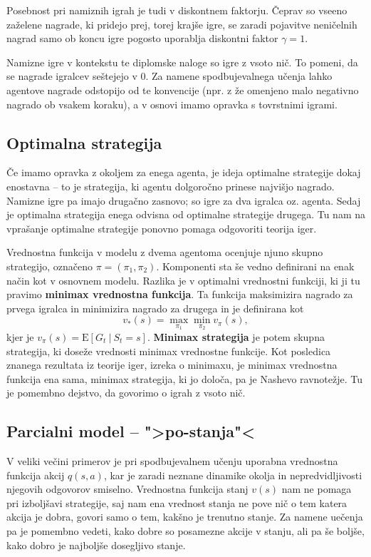\documentclass[12pt,a4paper]{amsart}
\theoremstyle{definition} %
\theoremstyle{plain} %
\begin{document}
Posebnost pri namiznih igrah je tudi v diskontnem faktorju. Čeprav so vseeno zaželene nagrade, ki 
pridejo prej, torej krajše igre, se zaradi pojavitve neničelnih nagrad samo ob koncu igre pogosto 
uporablja diskontni faktor $\gamma = 1$.

Namizne igre v kontekstu te diplomske naloge so igre z vsoto nič. To pomeni, da se nagrade igralcev 
seštejejo v $0$. Za namene spodbujevalnega učenja lahko agentove nagrade odstopijo od te konvencije
(npr. z že omenjeno malo negativno nagrado ob vsakem koraku), a v osnovi imamo opravka s tovrstnimi 
igrami.

\subsection{Optimalna strategija}
Če imamo opravka z okoljem za enega agenta, je ideja optimalne strategije dokaj enostavna -- to
je strategija, ki agentu dolgoročno prinese najvišjo nagrado. Namizne igre pa imajo drugačno zasnovo; 
so igre za dva igralca oz. agenta. Sedaj je optimalna strategija enega odvisna od optimalne strategije 
drugega. Tu nam na vprašanje optimalne strategije ponovno pomaga odgovoriti teorija iger. 

Vrednostna funkcija v modelu z dvema agentoma ocenjuje njuno skupno strategijo, označeno $\pi = (\pi_1, 
\pi_2)$. Komponenti sta še vedno definirani na enak način kot v osnovnem modelu. Razlika je v optimalni 
vrednostni funkciji, ki ji tu pravimo \textbf{minimax vrednostna funkcija}. Ta funkcija maksimizira 
nagrado za prvega igralca in minimizira nagrado za drugega in je definirana kot
$$
v_*(s) = \max_{\pi_1} \min_{\pi_2} v_\pi(s), 
$$
kjer je $v_\pi(s) = \mathrm{E} [G_t~|~S_t = s]$. \textbf{Minimax strategija} je potem skupna strategija, 
ki doseže vrednosti minimax vrednostne funkcije. Kot posledica znanega rezultata iz teorije iger, 
izreka o minimaxu, je minimax vrednostna funkcija ena sama, minimax strategija, ki jo določa, pa je 
Nashevo ravnotežje. Tu je pomembno dejstvo, da govorimo o igrah z vsoto nič.

\subsection{Parcialni model -- ">po-stanja"<}
V veliki večini primerov je pri spodbujevalnem učenju uporabna vrednostna funkcija akcij $q(s, a)$, 
kar je zaradi neznane dinamike okolja in nepredvidljivosti njegovih odgovorov smiselno. Vrednostna 
funkcija stanj $v(s)$ nam ne pomaga pri izboljšavi strategije, saj nam ena vrednost stanja ne pove 
nič o tem katera akcija je dobra, govori samo o tem, kakšno je trenutno stanje. Za namene uečenja 
pa je pomembno vedeti, kako dobre so posamezne akcije v stanju, ali pa še boljše, kako dobro je 
najboljše dosegljivo stanje. 
\end{document}
